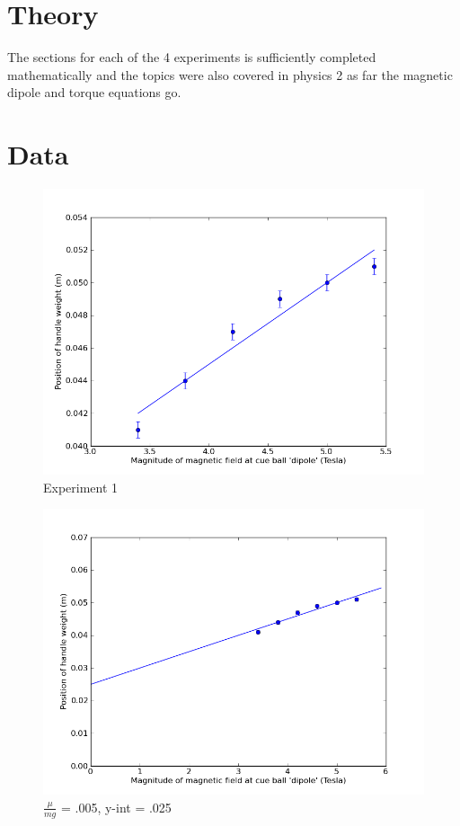 \documentclass[12pt]{article}
\begin{document}
\section{Theory}
\indent \indent The sections for each of the 4 experiments is sufficiently completed mathematically and the topics were also covered in physics 2 as far the magnetic dipole and torque equations go.

\section{Data}
\begin{figure}[H]
\centering
\hspace{-0.0in}\includegraphics[scale=0.50]{Plot1.png}
\caption{Experiment 1 \label{fig:setup}}
\end{figure}

\begin{figure}[H]
\centering
\hspace{-0.0in}\includegraphics[scale=0.50]{Plot2.png}
\caption{$\frac{\mu}{mg}$ = .005, y-int = .025 \label{fig:setup}}
\end{figure}
\end{document}
